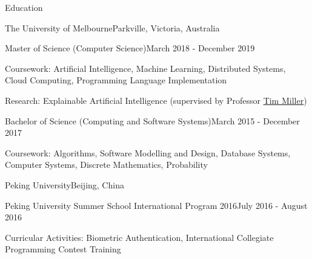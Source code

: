 \documentclass{cv}
\begin{document}
\address{
\textbf{Phone} +86 136******** $\cdot$\space
\textbf{Email} \href{mailto:luo@jiahai.co}{luo@jiahai.co} $\cdot$\space
\textbf{LinkedIn} \href{https://linkedin.com/in/luojiahai/}{in/luojiahai} $\cdot$\space
\textbf{GitHub} \href{https://github.com/luojiahai/}{luojiahai} $\cdot$\space
\textbf{Site} \href{https://luojiahai.com/}{luojiahai.com}
}

\begin{cvsection}{Education}

\begin{cvheading}{The University of Melbourne}{Parkville, Victoria, Australia}
\begin{cvsubheading}{Master of Science (Computer Science)}{March 2018 - December 2019}
\item Coursework: Artificial Intelligence, Machine Learning, Distributed Systems, Cloud Computing, Programming Language Implementation
\item Research: Explainable Artificial Intelligence (supervised by Professor \href{https://eecs.uq.edu.au/profile/9477/tim-miller}{Tim Miller})
\end{cvsubheading}
\begin{cvsubheading}{Bachelor of Science (Computing and Software Systems)}{March 2015 - December 2017}
\item Coursework: Algorithms, Software Modelling and Design, Database Systems, Computer Systems, Discrete Mathematics, Probability
\end{cvsubheading}
\end{cvheading}

\begin{cvheading}{Peking University}{Beijing, China}
\begin{cvsubheading}{Peking University Summer School International Program 2016}{July 2016 - August 2016}
\item Curricular Activities: Biometric Authentication, International Collegiate Programming Contest Training
\end{cvsubheading}
\end{cvheading}

\end{cvsection}
\end{document}
